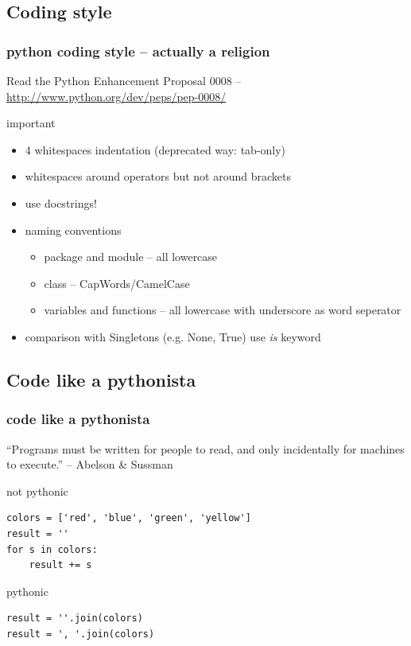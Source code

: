 \documentclass{beamer}
\begin{document}
\subsection{Coding style}
\begin{frame}[fragile]
	\frametitle{python coding style -- actually a religion}
	Read the Python Enhancement Proposal 0008 -- \url{http://www.python.org/dev/peps/pep-0008/}
	\begin{block}{important}
	\begin{itemize}
	\item 4 whitespaces indentation (deprecated way: tab-only)
	\item whitespaces around operators but not around brackets
	\item use docstrings!
	\item naming conventions
		\begin{itemize}
		\item package and module -- all lowercase
		\item class -- CapWords/CamelCase
		\item variables and functions -- all lowercase with underscore as word seperator
		\end{itemize}
	\item comparison with Singletons (e.g. None, True) use \emph{is} keyword
	\end{itemize}
	\end{block}

\end{frame}

\subsection{Code like a pythonista} 
\begin{frame}[fragile]
	\frametitle{code like a pythonista}
    ``Programs must be written for people to read, and only incidentally for machines to execute.'' -- Abelson \& Sussman\\
\pause    
    
    \begin{alertblock}{not pythonic}
    \begin{lstlisting}
colors = ['red', 'blue', 'green', 'yellow']
result = ''
for s in colors:
    result += s
    \end{lstlisting}
    \end{alertblock}
  	\pause
    \begin{exampleblock}{pythonic}
    \begin{lstlisting}
result = ''.join(colors)
result = ', '.join(colors)
    \end{lstlisting}
    \end{exampleblock}
\end{frame}
\end{document}
